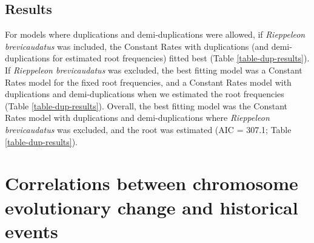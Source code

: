 \documentclass[a4paper, 12pt]{article}
\begin{document}


\subsection{Results}

For models where duplications and demi-duplications were allowed, if \textit{Rieppeleon brevicaudatus} was included, the Constant Rates with duplications (and demi-duplications for estimated root frequencies) fitted best (Table \ref{table-dup-results}). If \textit{Rieppeleon brevicaudatus} was excluded, the best fitting model was a Constant Rates model for the fixed root frequencies, and a Constant Rates model with duplications and demi-duplications when we estimated the root frequencies (Table \ref{table-dup-results}). Overall, the best fitting model was the Constant Rates model with duplications and demi-duplications where \textit{Rieppeleon brevicaudatus} was excluded, and the root was estimated (AIC = 307.1; Table \ref{table-dup-results}).



\newpage
\section{Correlations between chromosome evolutionary change and historical events}
\end{document}
